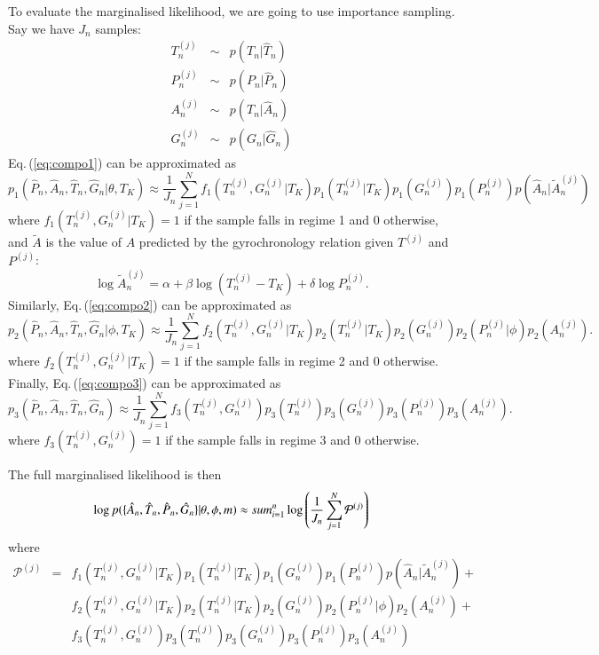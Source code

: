 \documentclass[11pt,a4paper]{article}
\begin{document}
To evaluate the marginalised likelihood, we are going to use
importance sampling. Say we have $J_n$ samples:
\begin{eqnarray}
T_n^{(j)} & \sim & p(T_n|\hat{T}_n) \nonumber \\
P_n^{(j)} & \sim & p(P_n|\hat{P}_n)  \nonumber  \\
A_n^{(j)} & \sim & p(T_n|\hat{A}_n)  \nonumber  \\
G_n^{(j)} & \sim & p(G_n|\hat{G}_n) 
\end{eqnarray}
Eq.\,(\ref{eq:compo1}) can be approximated as
\begin{equation}
p_1(\hat{P}_n,\hat{A}_n,\hat{T}_n,\hat{G}_n|\theta,T_K) \approx \frac{1}{J_n}\sum_{j=1}^N f_1(T_n^{(j)},G_n^{(j)}|T_K) p_1(T^{(j)}_n|T_K) p_1(G^{(j)}_n) p_1(P^{(j)}_n) p(\hat{A}_n|\tilde{A}_n^{(j)})
\end{equation}
where $f_1(T_n^{(j)},G_n^{(j)}|T_K) = 1$ if the sample falls in regime
1 and 0 otherwise, and $\tilde{A}$ is the value of $A$ predicted by
the gyrochronology relation given $T^{(j)}$ and $P^{(j)}$:
\begin{equation}
\log \tilde{A}^{(j)}_n = \alpha+ \beta \log \left(T^{(j)}_n-T_K \right) + \delta \log P^{(j)}_n.
\end{equation}
Similarly, Eq.\,(\ref{eq:compo2}) can be approximated as
\begin{equation}
p_2(\hat{P}_n,\hat{A}_n,\hat{T}_n,\hat{G}_n|\phi,T_K) \approx \frac{1}{J_n}\sum_{j=1}^N f_2(T_n^{(j)},G_n^{(j)}|T_K) p_2(T^{(j)}_n|T_K) p_2(G^{(j)}_n) p_2(P^{(j)}_n|\phi) p_2(A^{(j)}_n).
\end{equation}
where $f_2(T_n^{(j)},G_n^{(j)}|T_K) = 1$ if the sample falls in regime
2 and 0 otherwise.  Finally, Eq.\,(\ref{eq:compo3}) can be
approximated as
\begin{equation}
p_3(\hat{P}_n,\hat{A}_n,\hat{T}_n,\hat{G}_n) \approx \frac{1}{J_n}\sum_{j=1}^N f_3(T_n^{(j)},G_n^{(j)}) p_3(T^{(j)}_n) p_3(G^{(j)}_n) p_3(P^{(j)}_n) p_3(A^{(j)}_n).
\end{equation}
where $f_3(T_n^{(j)},G_n^{(j)}) = 1$ if the sample falls in regime 3
and 0 otherwise.

The full marginalised likelihood is then
\begin{equation}
\log p(\{\hat{A}_n,\hat{T}_n,\hat{P}_n,\hat{G}_n\}|\theta,\phi,m)
\approx \\sum_{i=1}^n \log
\left(\frac{1}{J_n}\sum_{j=1}^N \mathcal{P}^{(j)} \right)
\end{equation}
where 
\begin{eqnarray}
\mathcal{P}^{(j)} & = &  f_1(T_n^{(j)},G_n^{(j)}|T_K) p_1(T^{(j)}_n|T_K) p_1(G^{(j)}_n) p_1(P^{(j)}_n) p(\hat{A}_n|\tilde{A}_n^{(j)}) + \nonumber \\
&& f_2(T_n^{(j)},G_n^{(j)}|T_K) p_2(T^{(j)}_n|T_K) p_2(G^{(j)}_n)
p_2(P^{(j)}_n|\phi) p_2(A^{(j)}_n) + \nonumber \\
&& f_3(T_n^{(j)},G_n^{(j)}) p_3(T^{(j)}_n) p_3(G^{(j)}_n) p_3(P^{(j)}_n) p_3(A^{(j)}_n) 
\end{eqnarray}
\end{document}
